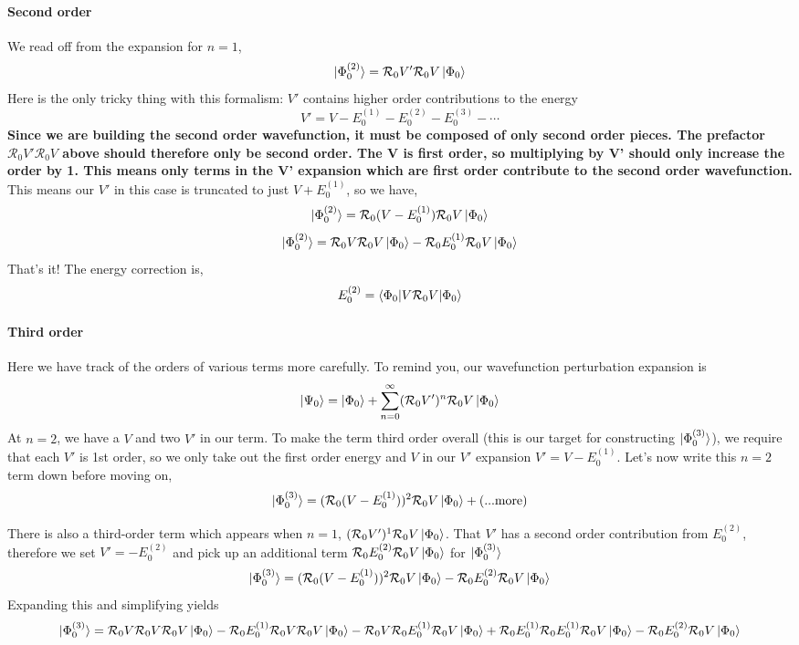 \documentclass{article}
\newcommand{\Rz}{\mathcal{R}_{0}}
\newcommand{\Eone}{E^{(1)}}
\begin{document}
\paragraph{\textbf{Second order}}
We read off from the expansion for $n=1$,
\[ \ket{\Phi_0^{(2)}} = \Rz V' \Rz V \ket{\Phi_0}\]
Here is the only tricky thing with this formalism: $V'$ contains 
higher order contributions to the energy 
\[V' = V - E_0^{(1)} - E_0^{(2)} - E_0^{(3)} - \cdots\]
\textbf{Since we are building the second order wavefunction, it must be composed of only 
second order pieces. The prefactor $\Rz V' \Rz V$ above should therefore only be second order. 
The V is first order, so multiplying by V' should only increase the order by 1. 
This means only terms in the V' expansion which are first order contribute 
to the second order wavefunction.}
This means our $V'$ in this case is truncated to just $V + E_0^{(1)}$,
so we have,
\[\ket{\Phi_0^{(2)}} = \Rz (V - \Eone_0) \Rz V \ket{\Phi_0}\]
\[\ket{\Phi_0^{(2)}} = \Rz V \Rz V \ket{\Phi_0} - \Rz \Eone_0 \Rz V \ket{\Phi_0}\]
That's it! 
The energy correction is,
\[ E_0^{(2)} = \braket{ \Phi_0 | V \Rz V | \Phi_0} \]

\paragraph{\textbf{Third order}}
Here we have track of the orders of various terms
more carefully. 
To remind you, our wavefunction perturbation expansion is 
\[\ket{\Psi_0} =  \ket{\Phi_0} + \sum_{n=0}^{\infty} (\Rz V')^n \Rz V \ket{\Phi_0} \]
At $n=2$, we have a $V$ and two $V'$ in our term.
To make the term third order overall (this is our target for constructing $\ket{\Phi_0^{(3)}}$),
we require that each $V'$ is 1st order, so we only take out the first order
energy and $V$ in our $V'$ expansion $V' = V - E_0^{(1)}$.
Let's now write this $n=2$ term down before moving on, 
\[\ket{\Phi_0^{(3)}} = (\Rz (V - \Eone_0))^2 \Rz V \ket{\Phi_0} + (... \mathrm{more})\]

There is also a third-order term which appears when $n=1$,
$(\Rz V')^1 \Rz V \ket{\Phi_0}$. That $V'$ has a second order contribution from $E_0^{(2)}$,
therefore we set $V' = -E_0^{(2)}$ and 
pick up an additional term $ \Rz E_0^{(2)} \Rz V \ket{\Phi_0}$ for $\ket{\Phi_0^{(3)}}$
\[\ket{\Phi_0^{(3)}} = (\Rz (V - \Eone_0))^2 \Rz V \ket{\Phi_0} - \Rz E_0^{(2)} \Rz V \ket{\Phi_0} \]
Expanding this and simplifying yields
\[\ket{\Phi_0^{(3)}} = \Rz V \Rz V \Rz V \ket{\Phi_0} - \Rz \Eone_0 \Rz V \Rz V \ket{\Phi_0} 
  - \Rz V \Rz \Eone_0 \Rz V \ket{\Phi_0} + \Rz E_0^{(1)} \Rz E_0^{(1)} \Rz V \ket{\Phi_0} 
 - \Rz E_0^{(2)} \Rz V \ket{\Phi_0} \]
\end{document}
